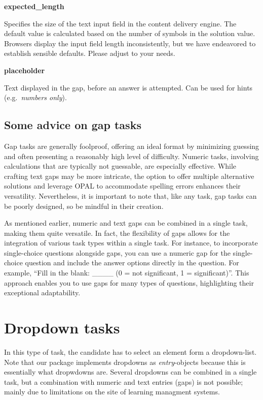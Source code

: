 \documentclass[twoside]{tufte-book}
\begin{document}
\noindent\textbf{expected\_length}\label{expected_length-1}

Specifies the size of the text input field in the content delivery engine. The default value is calculated based on the number of symbols in the solution value. Browsers display the input field length inconsistently, but we have endeavored to establish sensible defaults. Please adjust to your needs.

\noindent\textbf{placeholder}\label{placeholder-1}

Text displayed in the gap, before an answer is attempted. Can be used for hints (e.g.~\emph{numbers only}).

\section{Some advice on gap tasks}\label{some-advice-on-gap-tasks}

Gap tasks are generally foolproof, offering an ideal format by minimizing guessing and often presenting a reasonably high level of difficulty. Numeric tasks, involving calculations that are typically not guessable, are especially effective. While crafting text gaps may be more intricate, the option to offer multiple alternative solutions and leverage OPAL to accommodate spelling errors enhances their versatility. Nevertheless, it is important to note that, like any task, gap tasks can be poorly designed, so be mindful in their creation.

As mentioned earlier, numeric and text gaps can be combined in a single task, making them quite versatile. In fact, the flexibility of gaps allows for the integration of various task types within a single task. For instance, to incorporate single-choice questions alongside gaps, you can use a numeric gap for the single-choice question and include the answer options directly in the question. For example, ``Fill in the blank: \_\_\_\_ (0 = not significant, 1 = significant)''. This approach enables you to use gaps for many types of questions, highlighting their exceptional adaptability.

\chapter{Dropdown tasks}\label{dropdown-tasks}

In this type of task, the candidate has to select an element form a dropdown-list. Note that our package implements dropdowns as \emph{entry}-objects because this is essentially what dropwdowns are. Several dropdowns can be combined in a single task, but a combination with numeric and text entries (gaps) is not possible; mainly due to limitations on the site of learning managment systems.
\end{document}
